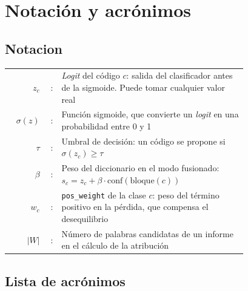 %
%
\cleardoublepage
{} %

\chapter*{Notación y acrónimos} %

\section*{Notacion}

\begin{tabular}{r r p{0.78\linewidth}}
$z_c$        & : & \emph{Logit} del código $c$: salida del clasificador antes de la sigmoide. Puede tomar cualquier valor real \\
$\sigma(z)$  & : & Función sigmoide, que convierte un \emph{logit} en una probabilidad entre 0 y 1 \\
$\tau$       & : & Umbral de decisión: un código se propone si $\sigma(z_c) \geq \tau$ \\
$\beta$      & : & Peso del diccionario en el modo fusionado: $s_c = z_c + \beta \cdot \mathrm{conf}(\mathrm{bloque}(c))$ \\
$w_c$        & : & \texttt{pos\_weight} de la clase $c$: peso del término positivo en la pérdida, que compensa el desequilibrio \\
$|W|$        & : & Número de palabras candidatas de un informe en el cálculo de la atribución \\
\end{tabular}

\section*{Lista de acrónimos}


